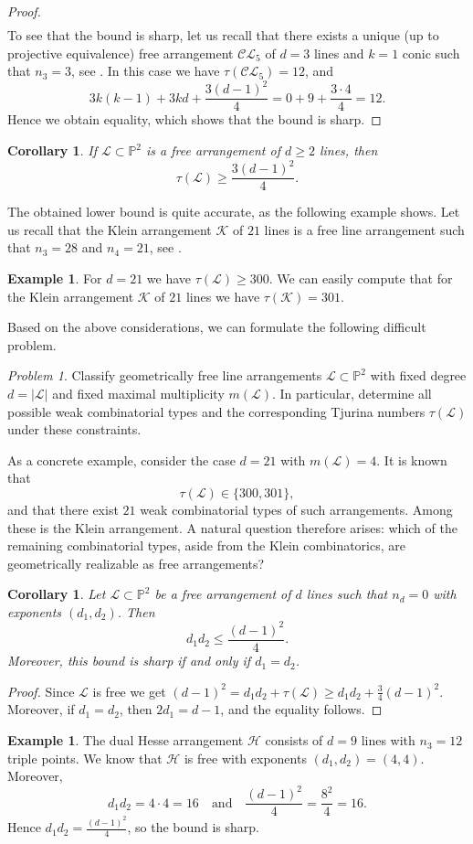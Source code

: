 \documentclass[11pt]{article}
\theoremstyle{plain}
\newtheorem{corollary}[theorem]{Corollary}
\theoremstyle{definition}
\newtheorem{example}[theorem]{Example}
\theoremstyle{remark}
\newtheorem{problem}[theorem]{Problem}
\begin{document}
\begin{proof}
\begin{multline*}
\end{multline*}
To see that the bound is sharp, let us recall that there exists a unique (up to projective equivalence) free arrangement $\mathcal{CL}_{5}$ of $d=3$ lines and $k=1$ conic such that $n_{3}=3$, see \cite[Example~4.14 and Theorem~5.7]{DP22}. In this case we have $\tau(\mathcal{CL}_{5})=12$, and
\[
3k(k-1) + 3kd + \frac{3(d-1)^2}{4}
= 0 + 9 + \frac{3\cdot4}{4}
= 12.
\]
Hence we obtain equality, which shows that the bound is sharp.
\end{proof}
\begin{corollary}
If $\mathcal{L} \subset \mathbb{P}^{2}$ is a free arrangement of $d\geq 2$ lines, then
$$\tau(\mathcal{L}) \geq \frac{3(d-1)^2}{4}.$$
\end{corollary}
The obtained lower bound is quite accurate, as the following example shows. Let us recall that the Klein arrangement $\mathcal{K}$ of $21$ lines is a free line arrangement such that $n_{3}=28$ and $n_{4}=21$, see \cite[Chapter 6]{OT92}.
\begin{example}
For $d=21$ we have $\tau(\mathcal{L})\geq 300$. We can easily compute that for the Klein arrangement $\mathcal{K}$ of $21$ lines we have $\tau(\mathcal{K}) = 301$.
\end{example}
Based on the above considerations, we can formulate the following difficult problem.
\begin{problem}
\label{prob}
Classify geometrically free line arrangements $\mathcal{L} \subset \mathbb{P}^2$
with fixed degree $d = |\mathcal{L}|$ and fixed maximal multiplicity
$m(\mathcal{L})$. In particular, determine all possible weak combinatorial types and the corresponding Tjurina numbers $\tau(\mathcal{L})$ under these constraints.
\end{problem}
As a concrete example, consider the case $d = 21$ with $m(\mathcal{L}) = 4$. It is known that
\[\tau(\mathcal{L}) \in \{300,301\},\]
and that there exist $21$ weak combinatorial types of such arrangements. Among these is the Klein arrangement. A natural question therefore arises: which of the remaining combinatorial types, aside from the Klein combinatorics, are geometrically realizable as free arrangements?

\begin{corollary}
Let $\mathcal{L}\subset \mathbb{P}^{2}$ be a free arrangement of $d$ lines such that $n_{d} = 0$ with exponents $(d_{1},d_{2})$. Then $$d_{1}d_{2} \leq \frac{(d-1)^{2}}{4}.$$
Moreover, this bound is sharp if and only if $d_{1}=d_{2}$.
\end{corollary}
\begin{proof}
Since $\mathcal{L}$ is free we get $(d-1)^{2} = d_{1}d_{2}+\tau(\mathcal{L}) \geq d_{1}d_{2} + \frac{3}{4}(d-1)^{2}$.
Moreover, if $d_{1}=d_{2}$, then $2d_{1}=d-1$, and the equality follows.
\end{proof}
\begin{example}
The dual Hesse arrangement $\mathcal{H}$ consists of $d=9$ lines with $n_{3}=12$ triple points. 
We know that $\mathcal{H}$ is free with exponents $(d_{1},d_{2})=(4,4)$. Moreover,
\[
d_{1}d_{2}=4\cdot4=16
\quad\text{and}\quad
\frac{(d-1)^{2}}{4}=\frac{8^{2}}{4}=16.
\]
Hence $d_{1}d_{2}=\frac{(d-1)^{2}}{4}$, so the bound is sharp.
\end{example}
\end{document}
